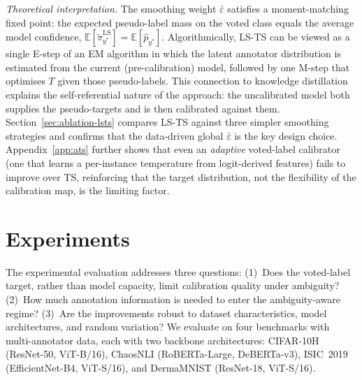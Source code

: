 \documentclass[10pt,journal,compsoc]{IEEEtran}
\newcommand{\tpihat}{\tilde{\pi}}
\begin{document}
\noindent\textit{Theoretical interpretation.}
The smoothing weight $\bar\varepsilon$ satisfies a moment-matching fixed point: the expected pseudo-label mass on the voted class equals the average model confidence, $\mathbb{E}[\tpihat^{\mathrm{LS}}_{y^*}] = \mathbb{E}[\hat p_{y^*}]$.  Algorithmically, LS-TS can be viewed as a single E-step of an EM algorithm in which the latent annotator distribution is estimated from the current (pre-calibration) model, followed by one M-step that optimises $T$ given those pseudo-labels.  This connection to knowledge distillation \cite{hinton2015distilling} explains the self-referential nature of the approach: the uncalibrated model both supplies the pseudo-targets and is then calibrated against them.  Section~\ref{sec:ablation-lsts} compares LS-TS against three simpler smoothing strategies and confirms that the data-driven global $\bar\varepsilon$ is the key design choice.  Appendix~\ref{app:ats} further shows that even an \emph{adaptive} voted-label calibrator (one that learns a per-instance temperature from logit-derived features) fails to improve over TS, reinforcing that the target distribution, not the flexibility of the calibration map, is the limiting factor.

\section{Experiments}
\label{sec:experiments}

The experimental evaluation addresses three questions: (1)~Does the voted-label target, rather than model capacity, limit calibration quality under ambiguity? (2)~How much annotation information is needed to enter the ambiguity-aware regime? (3)~Are the improvements robust to dataset characteristics, model architectures, and random variation?  We evaluate on four benchmarks with multi-annotator data, each with two backbone architectures: CIFAR-10H (ResNet-50, ViT-B/16), ChaosNLI (RoBERTa-Large, DeBERTa-v3), ISIC~2019 (EfficientNet-B4, ViT-S/16), and DermaMNIST (ResNet-18, ViT-S/16).
\end{document}
